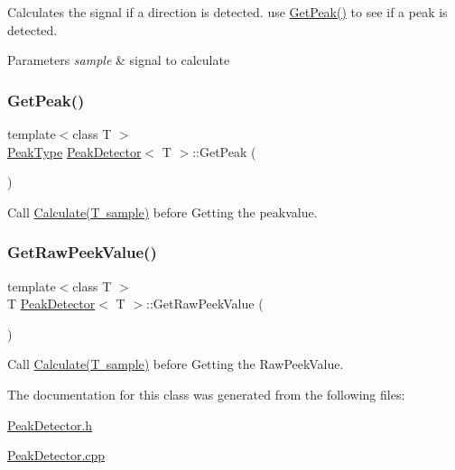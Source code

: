Calculates the signal if a direction is detected. use \mbox{\hyperlink{class_peak_detector_a72f7916aa1d26388c9d70eee1cd5e3bc}{Get\+Peak()}} to see if a peak is detected. 


\begin{DoxyParams}{Parameters}
{\em sample} & signal to calculate \\
\hline
\end{DoxyParams}
\mbox{\label{class_peak_detector_a72f7916aa1d26388c9d70eee1cd5e3bc}} 
\subsubsection{\texorpdfstring{Get\+Peak()}{GetPeak()}}
{\footnotesize\ttfamily template$<$class T $>$ \\
\mbox{\hyperlink{_peak_detector_8h_a4791e14c9f62a95fdf58cd8b41ca6a08}{Peak\+Type}} \mbox{\hyperlink{class_peak_detector}{Peak\+Detector}}$<$ T $>$\+::Get\+Peak (\begin{DoxyParamCaption}{ }\end{DoxyParamCaption})}



Call \mbox{\hyperlink{class_peak_detector_a888b9d29612caf03e7417ab3593f6392}{Calculate(\+T sample)}} before Getting the peakvalue. 

\mbox{\label{class_peak_detector_aebfc5583c4c696119bbe834b1474d896}} 
\subsubsection{\texorpdfstring{Get\+Raw\+Peek\+Value()}{GetRawPeekValue()}}
{\footnotesize\ttfamily template$<$class T $>$ \\
T \mbox{\hyperlink{class_peak_detector}{Peak\+Detector}}$<$ T $>$\+::Get\+Raw\+Peek\+Value (\begin{DoxyParamCaption}{ }\end{DoxyParamCaption})}



Call \mbox{\hyperlink{class_peak_detector_a888b9d29612caf03e7417ab3593f6392}{Calculate(\+T sample)}} before Getting the Raw\+Peek\+Value. 



The documentation for this class was generated from the following files\+:\begin{DoxyCompactItemize}
\item 
\mbox{\hyperlink{_peak_detector_8h}{Peak\+Detector.\+h}}\item 
\mbox{\hyperlink{_peak_detector_8cpp}{Peak\+Detector.\+cpp}}\end{DoxyCompactItemize}
